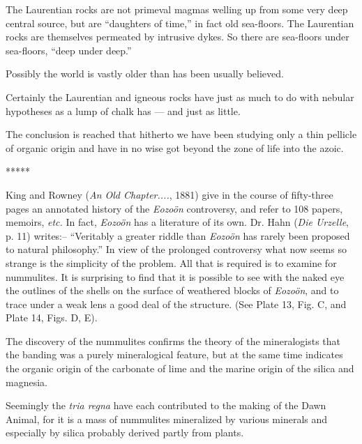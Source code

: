 \documentclass[a4paper, 12pt, oneside, landscape]{article}
\begin{document}
The Laurentian rocks are not primeval magmas welling up from some very deep central source, but are ``daughters of time,'' in fact old sea-floors. The Laurentian rocks are themselves permeated by intrusive dykes. So there are sea-floors under sea-floors, ``deep under deep.''

Possibly the world is vastly older than has been usually believed.

Certainly the Laurentian and igneous rocks have just as much to do with nebular hypotheses as a lump of chalk has --- and just as little.

The conclusion is reached that hitherto we have been studying only a thin pellicle of organic origin and have in no wise got beyond the zone of life into the azoic.

\centerline{*\hspace{15mm}*\hspace{15mm}*\hspace{15mm}*\hspace{15mm}*}
\bigskip

King and Rowney (\emph{An Old Chapter....}, 1881) give in the course of fifty-three pages an annotated history of the \emph{Eozoön} controversy, and refer to 108 papers, memoirs, \emph{etc.} In fact, \emph{Eozoön} has a literature of its own. Dr. Hahn (\emph{Die Urzelle}, p. 11) writes:-- ``Veritably a greater riddle than \emph{Eozoön} has rarely been proposed to natural philosophy.'' In view of the prolonged controversy what now seems so strange is the simplicity of the problem. All that is required is to examine for nummulites. It is surprising to find that it is possible to see with the naked eye the outlines of the shells on the surface of weathered blocks of \emph{Eozoön}, and to trace under a weak lens a good deal of the structure. (See Plate 13, Fig. C, and Plate 14, Figs. D, E).

The discovery of the nummulites confirms the theory of the mineralogists that the banding was a purely mineralogical feature, but at the same time indicates the organic origin of the carbonate of lime and the marine origin of the silica and magnesia.

Seemingly the \emph{tria regna} have each contributed to the making of the Dawn Animal, for it is a mass of nummulites mineralized by various minerals and especially by silica probably derived partly from plants.
\end{document}
